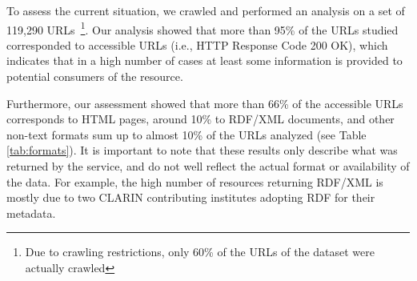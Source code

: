 \documentclass[11pt]{article}
\begin{document}
To assess the current situation, we crawled and performed an analysis on a set of 
119,290 URLs~\footnote{Due to crawling restrictions, only 60\% of the URLs of the dataset were actually crawled}.
Our analysis showed that more than 95\% of the URLs
studied corresponded to accessible URLs (i.e., HTTP Response Code 200 OK), which
indicates that in a high number of cases at least some information is provided
to potential consumers of the resource.

Furthermore, our
assessment showed that more than 66\% of the accessible URLs corresponds to HTML
pages, around 10\% to RDF/XML documents, and other non-text
formats sum up to almost 10\% of the URLs analyzed 
(see Table \ref{tab:formats}). It is important to note that these results
only describe what was returned by the service, and do not well reflect the
actual format or availability of the data. For example, the high number of
resources returning RDF/XML is mostly due to two CLARIN contributing institutes
adopting RDF for their metadata.

%	
%	
%	
%	
\end{document}
